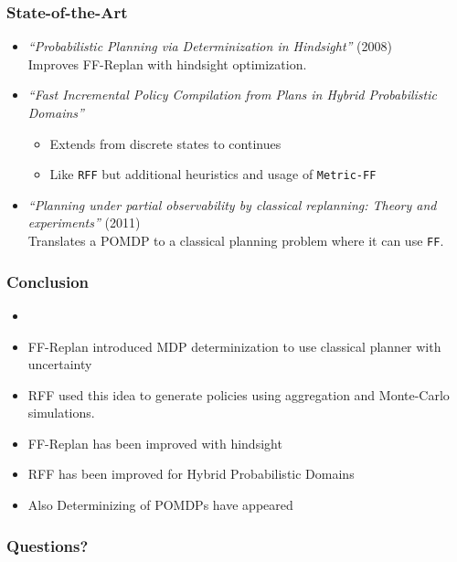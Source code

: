 \documentclass{beamer}
\let\origframetitle=\frametitle
\renewcommand\frametitle[1]{\origframetitle{\textbf{\large{\textrm{#1}}}}}
\begin{document}
\begin{frame}
  \frametitle{State-of-the-Art}

  \begin{itemize}
    \item \emph{``Probabilistic Planning via Determinization in Hindsight''} (2008) \\
      Improves FF-Replan with hindsight optimization.
    \item \emph{``Fast Incremental Policy Compilation from Plans in Hybrid Probabilistic Domains''}
      \begin{itemize}
        \item Extends from discrete states to continues
        \item Like \texttt{RFF} but additional heuristics and usage of \texttt{Metric-FF}
      \end{itemize}
    \item \emph{``Planning under partial observability by classical replanning: Theory and experiments''} (2011) \\
      Translates a POMDP to a classical planning problem where it can use \texttt{FF}.
  \end{itemize}

\end{frame}

\begin{frame}
  \frametitle{Conclusion}

  \begin{itemize}
    \item
    \item FF-Replan introduced MDP determinization to use classical planner with uncertainty
    \item RFF used this idea to generate policies using aggregation and Monte-Carlo simulations.
    \item FF-Replan has been improved with hindsight
    \item RFF has been improved for Hybrid Probabilistic Domains
    \item Also Determinizing of POMDPs have appeared
  \end{itemize}

\end{frame}


\begin{frame}
  \frametitle{Questions?}
\end{frame}
\end{document}

